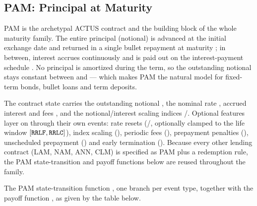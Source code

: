 \subsection{PAM: Principal at Maturity}\label{sec:pam}

PAM is the archetypal ACTUS contract and the building block of the whole
maturity family.  The entire principal (notional) is advanced at the initial
exchange date  and returned in a single bullet repayment at maturity
; in between, interest accrues continuously and is paid out on the
interest-payment schedule .  No principal is amortized during the term,
so the outstanding notional  stays constant between  and
 --- which makes PAM the natural model for fixed-term bonds, bullet
loans and term deposits.

The contract state carries the outstanding notional , the nominal
rate , accrued interest  and fees , and
the notional/interest scaling indices /.  Optional
features layer on through their own events: rate resets (/,
optionally clamped to the life window $[\texttt{RRLF},\texttt{RRLC}]$), index
scaling (), periodic fees (), prepayment penalties
(), unscheduled prepayment () and early termination
().  Because every other lending contract (LAM, NAM, ANN, CLM) is
specified as PAM plus a redemption rule, the PAM state-transition and payoff
functions below are reused throughout the family.

\begin{definition}\label{def:pam-stf}
        \leanok
        The PAM state-transition function , one branch per event
        type, together with the payoff function , as given by the
        table below.
\end{definition}

